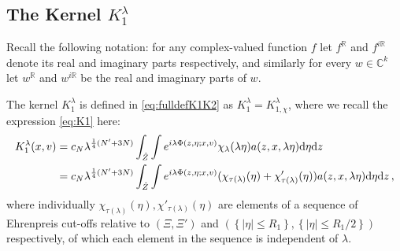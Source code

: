 \documentclass[
	fontsize=11pt, 
	twoside=false, 
	abstract=true, 
	a4paper,
]{scrartcl}
\newcommand{\RR}{\mathbb{R}}
\newcommand{\CC}{\mathbb{C}}
\newcommand{\dd}{\mathrm{d}}
\newcommand{\abs}[1]{\left\lvert#1\right\rvert}
\begin{document}
\subsection{The Kernel $K_1^\lambda$}\label{sec:K1}

Recall the following notation: for any complex-valued function $f$ let $f^{\RR}$ and $f^{i\RR}$ denote its real and imaginary parts respectively, and similarly for every $w \in \CC^k$ let $w^{\RR}$ and $w^{i\RR}$ be the real and imaginary parts of $w$.

The kernel $K_1^\lambda$ is defined in \cref{eq:fulldefK1K2} as $K_1^\lambda = K_{1,\chi}^\lambda$, where we recall the expression \cref{eq:K1} here:
\begin{align}
	K_1^\lambda(x,v) &= c_{N}\lambda^{\frac{1}{4}(N'+3N)}\int_{\hat Z}\int e^{i\lambda\Phi(z,\eta;x,v)}\chi_\lambda(\lambda\eta)a(z,x,\lambda\eta)\dd\eta\dd z\notag \\
	&= c_{N}\lambda^{\frac{1}{4}(N'+3N)}\int_{\hat Z}\int e^{i\lambda\Phi(z,\eta;x,v)}(\chi_{\tau(\lambda)}(\eta) + \chi'_{\tau(\lambda)}(\eta))a(z,x,\lambda\eta)\dd\eta\dd z\,,\label{eq:k1again}
\end{align}
where individually $\chi_{\tau(\lambda)}(\eta), \chi'_{\tau(\lambda)}(\eta)$ are elements of a sequence of Ehrenpreis cut-offs relative to $(\Xi,\Xi')$ and $\left(\left\{\abs{\eta} \leq R_1\right\}, \left\{\abs{\eta} \leq R_1/2\right\}\right)$ respectively, of which each element in the sequence is independent of $\lambda$. 
\end{document}
